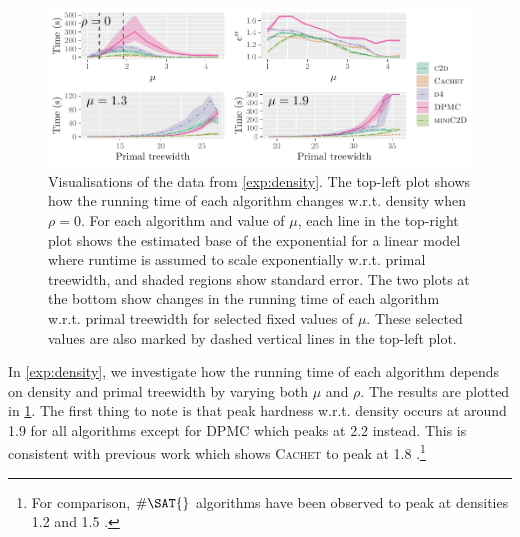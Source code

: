 \documentclass{article}
\theoremstyle{definition}
\theoremstyle{remark}
\begin{document}
\begin{figure}
  \centering
  \includegraphics{treewidth}
  \caption{Visualisations of the data from \cref{exp:density}. The top-left plot
    shows how the running time of each algorithm changes w.r.t. density
    when $\rho = 0$. For each algorithm and value of $\mu$, each line in the
    top-right plot shows the estimated base of the exponential for a linear
    model where runtime is assumed to scale exponentially w.r.t. primal
    treewidth, and shaded regions show standard error. The two plots at the
    bottom show changes in the running time of each algorithm w.r.t.
    primal treewidth for selected fixed values of $\mu$. These selected values
    are also marked by dashed vertical lines in the top-left plot.}
  \label{fig:treewidth}
\end{figure}

In \cref{exp:density}, we investigate how the running time of each algorithm
depends on density and primal treewidth by varying both $\mu$ and $\rho$. The
results are plotted in \cref{fig:treewidth}. The first thing to note is that
peak hardness w.r.t. density occurs at around 1.9 for all algorithms
except for \textsc{DPMC} \cite{DBLP:conf/cp/DudekPV20} which peaks at 2.2
instead. This is consistent with previous work which shows \textsc{Cachet} to
peak at 1.8 \cite{DBLP:conf/sat/SangBBKP04}.\footnote{For comparison, $\#\SAT{}$
  algorithms have been observed to peak at densities 1.2 and 1.5
  \cite{DBLP:conf/aaai/Pehoushek00}.}
\end{document}
